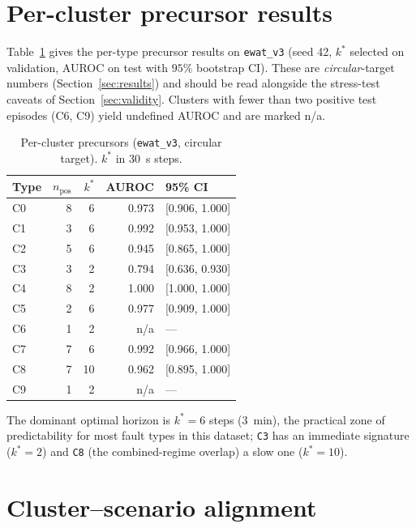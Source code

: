 \section{Per-cluster precursor results}
\label{app:precursor}

Table~\ref{tab:percluster} gives the per-type precursor results on \texttt{ewat\_v3} (seed 42,
$k^*$ selected on validation, AUROC on test with $95\%$ bootstrap CI). These are
\emph{circular}-target numbers (Section~\ref{sec:results}) and should be read alongside the
stress-test caveats of Section~\ref{sec:validity}. Clusters with fewer than two positive test
episodes (C6, C9) yield undefined AUROC and are marked n/a.

\begin{table}[h]
\centering
\caption{Per-cluster precursors (\texttt{ewat\_v3}, circular target). $k^*$ in 30~s steps.}
\label{tab:percluster}
\small
\begin{tabularx}{\columnwidth}{@{}lrrrX@{}}
\toprule
\textbf{Type} & $n_{\text{pos}}$ & $k^*$ & \textbf{AUROC} & \textbf{95\% CI} \\
\midrule
C0 & 8 & 6  & 0.973 & [0.906, 1.000] \\
C1 & 3 & 6  & 0.992 & [0.953, 1.000] \\
C2 & 5 & 6  & 0.945 & [0.865, 1.000] \\
C3 & 3 & 2  & 0.794 & [0.636, 0.930] \\
C4 & 8 & 2  & 1.000 & [1.000, 1.000] \\
C5 & 2 & 6  & 0.977 & [0.909, 1.000] \\
C6 & 1 & 2  & n/a   & --- \\
C7 & 7 & 6  & 0.992 & [0.966, 1.000] \\
C8 & 7 & 10 & 0.962 & [0.895, 1.000] \\
C9 & 1 & 2  & n/a   & --- \\
\bottomrule
\end{tabularx}
\end{table}

The dominant optimal horizon is $k^*=6$ steps ($3$~min), the practical zone of predictability for
most fault types in this dataset; \texttt{C3} has an immediate signature ($k^*=2$) and \texttt{C8}
(the combined-regime overlap) a slow one ($k^*=10$).

\section{Cluster--scenario alignment}
\label{app:nmi}

